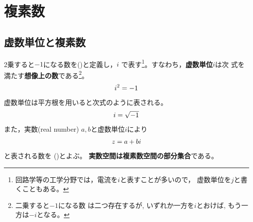 \documentclass[twocolumn,11pt]{jarticle}
\begin{document}


\newpage
\section{複素数}

\subsection{虚数単位と複素数}
2乗すると$-1$になる数を()と定義し，$i$
で表す\footnote{回路学等の工学分野では，電流を$i$と表すことが多いので，
  虚数単位を$j$と書くこともある。}。すなわち，\textbf{虚数単位}$i$は次
  式を満たす\textbf{想像上の数}である\footnote{二乗すると$-1$になる数
    は二つ存在するが, いずれか一方を$i$とおけば, もう一方は$-i$となる。}。
\begin{align}
  i^2=-1\notag
\end{align}
虚数単位は平方根を用いると次式のように表される。
\begin{align}
  i=\sqrt{-1}\notag
\end{align}
また，実数(real number) $a,b$と虚数単位$i$により
\begin{align}
  z=a+bi\notag
\end{align}
と表される数を
()とよぶ。
\textbf{実数空間は複素数空間の部分集合}である。
\end{document}
